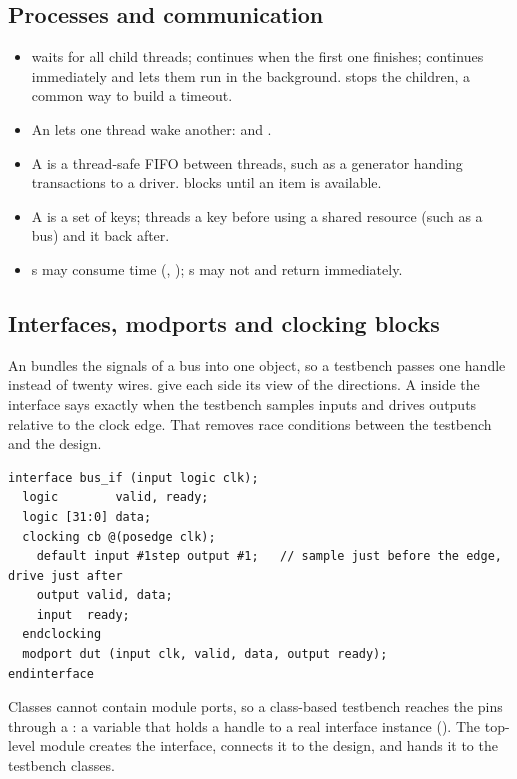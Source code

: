 \subsection*{Processes and communication}

\begin{itemize}
  \item {} waits for all child threads;  continues when the first one finishes;  continues immediately and lets them run in the background.  stops the children, a common way to build a timeout.
  \item An  lets one thread wake another:  and .
  \item A  is a thread-safe FIFO between threads, such as a generator handing transactions to a driver.  blocks until an item is available.
  \item A  is a set of keys; threads  a key before using a shared resource (such as a bus) and  it back after.
  \item {}s may consume time (, ); s may not and return immediately.
\end{itemize}

\subsection*{Interfaces, modports and clocking blocks}

An  bundles the signals of a bus into one object, so a testbench passes one handle instead of twenty wires.  give each side its view of the directions. A  inside the interface says exactly when the testbench samples inputs and drives outputs relative to the clock edge. That removes race conditions between the testbench and the design.

\begin{lstlisting}
interface bus_if (input logic clk);
  logic        valid, ready;
  logic [31:0] data;
  clocking cb @(posedge clk);
    default input #1step output #1;   // sample just before the edge, drive just after
    output valid, data;
    input  ready;
  endclocking
  modport dut (input clk, valid, data, output ready);
endinterface
\end{lstlisting}

Classes cannot contain module ports, so a class-based testbench reaches the pins through a : a variable that holds a handle to a real interface instance (). The top-level module creates the interface, connects it to the design, and hands it to the testbench classes.

